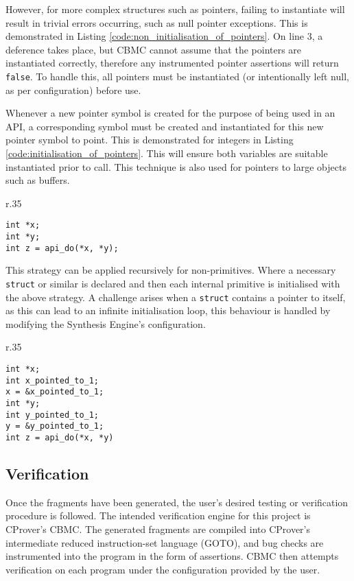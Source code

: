 \documentclass[EPiC]{easychair}
\begin{document}
However, for more complex structures such as pointers, failing to instantiate will result in trivial errors occurring, such as null pointer exceptions.  This is demonstrated in Listing \ref{code:non_initialisation_of_pointers}.  On line 3, a deference takes place, but CBMC cannot assume that the pointers are instantiated correctly, therefore any instrumented pointer assertions will return \texttt{false}.  To handle this, all pointers must be instantiated (or intentionally left null, as per configuration) before use.  

Whenever a new pointer symbol is created for the purpose of being used in an API, a corresponding symbol must be created and instantiated for this new pointer symbol to point.  This is demonstrated for integers in Listing \ref{code:initialisation_of_pointers}.  This will ensure both variables are suitable instantiated prior to call.  This technique is also used for pointers to large objects such as buffers.

\begin{wrapfigure}[7]{r}{.35\textwidth}
	\begin{lstlisting}[caption={Example of use of non-initialised pointers}, numbers=none, label={code:non_initialisation_of_pointers}]
int *x;
int *y;
int z = api_do(*x, *y);
	\end{lstlisting}
\end{wrapfigure}


This strategy can be applied recursively for non-primitives.  Where a necessary \texttt{struct} or similar is declared and then each internal primitive is initialised with the above strategy.  A challenge arises when a \texttt{struct} contains a pointer to itself, as this can lead to an infinite initialisation loop, this behaviour is handled by modifying the Synthesis Engine's configuration.  

\begin{wrapfigure}[11]{r}{.35\textwidth}
	\begin{lstlisting}[caption={Initialisation of pointers.}, numbers=none, label={code:initialisation_of_pointers}]
int *x;
int x_pointed_to_1;
x = &x_pointed_to_1;
int *y;
int y_pointed_to_1;
y = &y_pointed_to_1;
int z = api_do(*x, *y)
	\end{lstlisting}
\end{wrapfigure}



\subsection{Verification}
\label{sec:verification}
Once the fragments have been generated,  the user's desired testing or verification procedure is followed.  The intended verification engine for this project is CProver's CBMC.  The generated fragments are compiled into CProver's intermediate reduced instruction-set language (GOTO), and bug checks are instrumented into the program in the form of assertions.  CBMC then attempts verification on each program under the configuration provided by the user.
\end{document}
